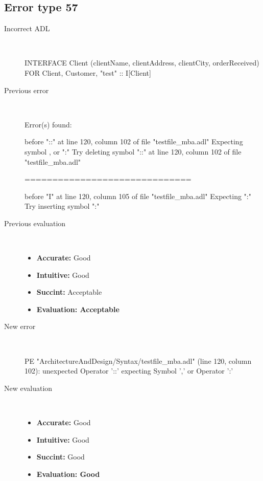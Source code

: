 \hrulefill

\subsection{Error type 57}
  \begin{description}
  \item[Incorrect ADL]~\\
\begin{adl}
INTERFACE Client (clientName, clientAddress, clientCity, orderReceived) FOR Client, Customer, "test" :: I[Client]\end{adl}
  \item[Previous error]~\\
\begin{haskell}
Error(s) found:

before "::" at line 120, column 102 of file "testfile_mba.adl"
Expecting symbol , or ":"
Try deleting symbol "::" at line 120, column 102 of file "testfile_mba.adl"

==============================

before "I" at line 120, column 105 of file "testfile_mba.adl"
Expecting ":"
Try inserting symbol ":"

\end{haskell}
  \item[Previous evaluation]~\\
    \begin{itemize}
    \item \textbf{Accurate:} Good
    \item \textbf{Intuitive:} Good
    \item \textbf{Succint:} Acceptable
    \item \textbf{Evaluation: Acceptable}
    \end{itemize}
  \item[New error]~\\
\begin{haskell}
PE "ArchitectureAndDesign/Syntax/testfile_mba.adl" (line 120, column 102):
unexpected Operator '::'
expecting Symbol ',' or Operator ':'
\end{haskell}
  \item[New evaluation]~\\
    \begin{itemize}
    \item \textbf{Accurate:} Good
    \item \textbf{Intuitive:} Good
    \item \textbf{Succint:} Good
    \item \textbf{Evaluation: Good
}
    \end{itemize}
  \end{description}

